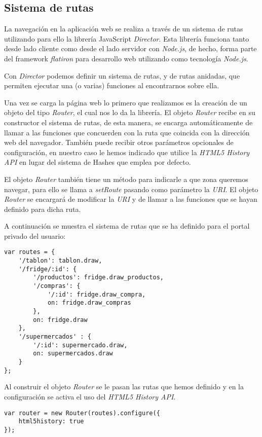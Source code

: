 \subsection{Sistema de rutas}

La navegación en la aplicación web se realiza a través de un sistema de rutas utilizando para ello la librería JavaScript \emph{Director}. Esta librería funciona tanto desde lado cliente como desde el lado servidor con \emph{Node.js}, de hecho, forma parte del framework \emph{flatiron} para desarrollo web utilizando como tecnología \emph{Node.js}.

Con \emph{Director} podemos definir un sistema de rutas, y de rutas anidadas, que permiten ejecutar una (o varias) funciones al encontrarnos sobre ella.

Una vez se carga la página web lo primero que realizamos es la creación de un objeto del tipo \emph{Router}, el cual nos lo da la librería. El objeto \emph{Router} recibe en su constructor el sistema de rutas, de esta manera, se encarga automáticamente de llamar a las funciones que concuerden con la ruta que coincida con la dirección web del navegador. También puede recibir otros parámetros opcionales de configuración, en nuestro caso le hemos indicado que utilice la \emph{HTML5 History API} en lugar del sistema de Hashes que emplea por defecto.

El objeto \emph{Router} también tiene un método para indicarle a que zona queremos navegar, para ello se llama a \emph{setRoute} pasando como parámetro la \emph{URI}. El objeto \emph{Router} se encargará de modificar la \emph{URI} y de llamar a las funciones que se hayan definido para dicha ruta.

A continuación se muestra el sistema de rutas que se ha definido para el portal privado del usuario:

    \begin{lstlisting}
var routes = {
    '/tablon': tablon.draw,
    '/fridge/:id': {
        '/productos': fridge.draw_productos,
        '/compras': {
            '/:id': fridge.draw_compra,
            on: fridge.draw_compras
        },
        on: fridge.draw
    },
    '/supermercados' : {
        '/:id': supermercado.draw,
        on: supermercados.draw
    }
};
    \end{lstlisting}

Al construir el objeto \emph{Router} se le pasan las rutas que hemos definido y en la configuración se activa el uso del \emph{HTML5 History API}.

    \begin{lstlisting}
var router = new Router(routes).configure({
    html5history: true
});
    \end{lstlisting}

